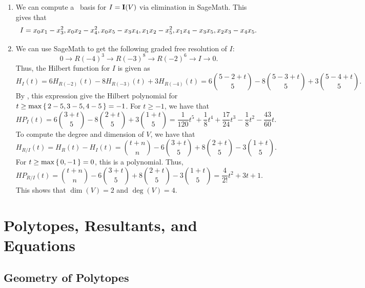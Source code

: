 \documentclass[letterpaper, 11pt, oneside]{book}
\begin{document}
\begin{sol}\label{ex:UAG_6.4.22}
  \begin{enumerate}
    \item We can compute a \Grobner\ basis for $I = \operatorname{\mathbf{I}}(V)$ via elimination in SageMath.
          This gives that
          \[
            I = \gen{x_{0}x_{1} - x_{3}^{2}, x_{0}x_{2} - x_{4}^{2}, x_{0}x_{5} - x_{3}x_{4}, x_{1}x_{2} - x_{5}^{2}, x_{1}x_{4} - x_{3}x_{5}, x_{2}x_{3} - x_{4}x_{5}}.
          \]
    \item We can use SageMath to get the following graded free resolution of $I$:
          \[
            0 \to R(-4)^{3} \to R(-3)^{8} \to R(-2)^{6} \to I \to 0.
          \]
          Thus, the Hilbert function for $I$ is given as
          \[
            H_{I}(t) = 6 H_{R(-2)}(t) - 8 H_{R(-3)}(t) + 3 H_{R(-4)}(t) = 6 \binom{5 - 2 + t}{5} - 8 \binom{5 - 3 + t}{5} + 3 \binom{5 - 4 + t}{5}.
          \]
          By , this expression give the Hilbert polynomial for $t \geq \max\set{2 - 5, 3 - 5, 4 - 5} = -1$.
          For $t \geq -1$, we have that
          \[
            HP_{I}(t) = 6 \binom{3 + t}{5} - 8 \binom{2 + t}{5} + 3 \binom{1 + t}{5} = \frac{1}{120}t^{5} + \frac{1}{8}t^{4} + \frac{17}{24}t^{3} - \frac{1}{8}t^{2} - \frac{43}{60}t.
          \]
          To compute the degree and dimension of $V$, we have that
          \[
            H_{R /I}(t) = H_{R}(t) - H_{I}(t) = \binom{t + n}{n} - 6 \binom{3 + t}{5} + 8 \binom{2 + t}{5} - 3 \binom{1 + t}{5}.
          \]
          For $t \geq \max\set{0, -1} = 0$, this is a polynomial.
          Thus,
          \[
            HP_{R/I}(t) = \binom{t + n}{n} - 6 \binom{3 + t}{5} + 8 \binom{2 + t}{5} - 3 \binom{1 + t}{5} = \frac{4}{2!}t^{2} + 3t + 1.
          \]
          This shows that $\dim(V) = 2$ and $\deg(V) = 4$.
  \end{enumerate}
\end{sol}

\chapter{Polytopes, Resultants, and Equations}

\section{Geometry of Polytopes}
\end{document}

